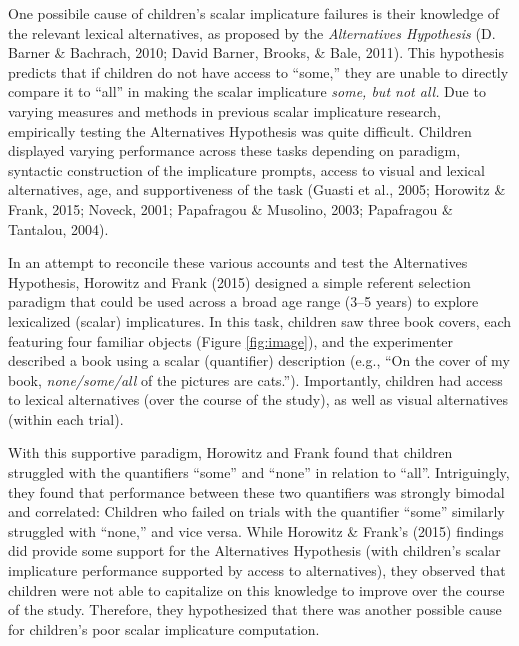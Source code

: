 \documentclass[10pt, letterpaper]{article}
\begin{document}
One possibile cause of children's scalar implicature failures is their
knowledge of the relevant lexical alternatives, as proposed by the
\emph{Alternatives Hypothesis} (D. Barner \& Bachrach, 2010; David
Barner, Brooks, \& Bale, 2011). This hypothesis predicts that if
children do not have access to ``some,'' they are unable to directly
compare it to ``all'' in making the scalar implicature \emph{some, but
not all.} Due to varying measures and methods in previous scalar
implicature research, empirically testing the Alternatives Hypothesis
was quite difficult. Children displayed varying performance across these
tasks depending on paradigm, syntactic construction of the implicature
prompts, access to visual and lexical alternatives, age, and
supportiveness of the task (Guasti et al., 2005; Horowitz \& Frank,
2015; Noveck, 2001; Papafragou \& Musolino, 2003; Papafragou \&
Tantalou, 2004).

In an attempt to reconcile these various accounts and test the
Alternatives Hypothesis, Horowitz and Frank (2015) designed a simple
referent selection paradigm that could be used across a broad age range
(3--5 years) to explore lexicalized (scalar) implicatures. In this task,
children saw three book covers, each featuring four familiar objects
(Figure \ref{fig:image}), and the experimenter described a book using a
scalar (quantifier) description (e.g., ``On the cover of my book,
\emph{none/some/all} of the pictures are cats.''). Importantly, children
had access to lexical alternatives (over the course of the study), as
well as visual alternatives (within each trial).

With this supportive paradigm, Horowitz and Frank found that children
struggled with the quantifiers ``some'' and ``none'' in relation to
``all''. Intriguingly, they found that performance between these two
quantifiers was strongly bimodal and correlated: Children who failed on
trials with the quantifier ``some'' similarly struggled with ``none,''
and vice versa. While Horowitz \& Frank's (2015) findings did provide
some support for the Alternatives Hypothesis (with children's scalar
implicature performance supported by access to alternatives), they
observed that children were not able to capitalize on this knowledge to
improve over the course of the study. Therefore, they hypothesized that
there was another possible cause for children's poor scalar implicature
computation.
\end{document}
